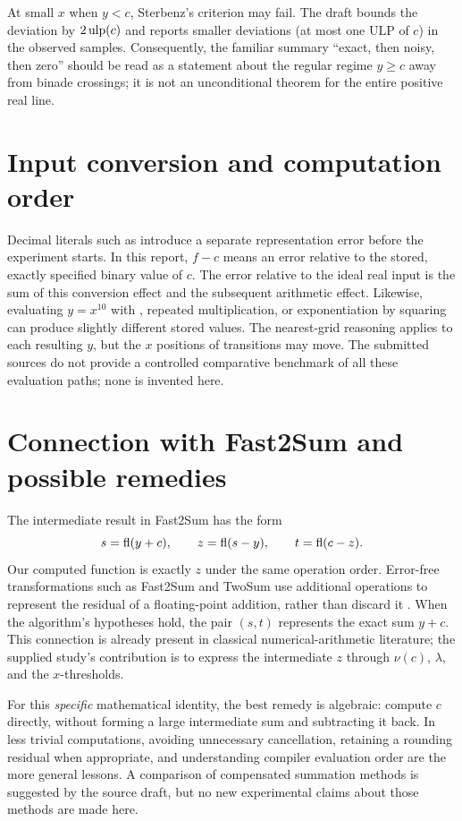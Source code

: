 At small $x$ when $y<c$, Sterbenz's criterion may fail. The draft bounds the deviation by $2\operatorname{ulp}(c)$ and reports smaller deviations (at most one ULP of $c$) in the observed samples. Consequently, the familiar summary ``exact, then noisy, then zero'' should be read as a statement about the regular regime $y\ge c$ away from binade crossings; it is not an unconditional theorem for the entire positive real line.

\section{Input conversion and computation order}
Decimal literals such as  introduce a separate representation error before the experiment starts. In this report, $f-c$ means an error relative to the stored, exactly specified binary value of $c$. The error relative to the ideal real input is the sum of this conversion effect and the subsequent arithmetic effect. Likewise, evaluating $y=x^{10}$ with , repeated multiplication, or exponentiation by squaring can produce slightly different stored values. The nearest-grid reasoning applies to each resulting $y$, but the $x$ positions of transitions may move. The submitted sources do not provide a controlled comparative benchmark of all these evaluation paths; none is invented here.

\section{Connection with Fast2Sum and possible remedies}
The intermediate result in Fast2Sum has the form
\begin{equation}
 s=\operatorname{fl}(y+c),\qquad z=\operatorname{fl}(s-y),\qquad t=\operatorname{fl}(c-z).
\end{equation}
Our computed function is exactly $z$ under the same operation order. Error-free transformations such as Fast2Sum and TwoSum use additional operations to represent the residual of a floating-point addition, rather than discard it \cite{dekker1971technique,knuth1997seminumerical}. When the algorithm's hypotheses hold, the pair $(s,t)$ represents the exact sum $y+c$. This connection is already present in classical numerical-arithmetic literature; the supplied study's contribution is to express the intermediate $z$ through $\nu(c)$, $\lambda$, and the $x$-thresholds.

For this \emph{specific} mathematical identity, the best remedy is algebraic: compute $c$ directly, without forming a large intermediate sum and subtracting it back. In less trivial computations, avoiding unnecessary cancellation, retaining a rounding residual when appropriate, and understanding compiler evaluation order are the more general lessons. A comparison of compensated summation methods is suggested by the source draft, but no new experimental claims about those methods are made here.

